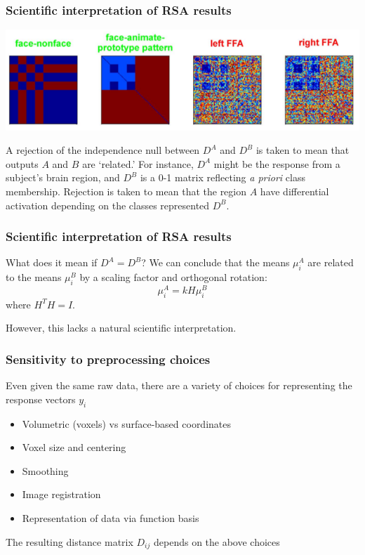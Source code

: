 \documentclass{beamer}
\begin{document}
\begin{frame}
\frametitle{Scientific interpretation of RSA results}
\begin{center}
\includegraphics[scale = 0.3]{k08_classes.png}
\end{center}

A rejection of the independence null between $D^A$ and $D^B$ is taken to mean that outputs $A$ and $B$ are `related.'
For instance, $D^A$ might be the response from a subject's brain region, and $D^B$ is a 0-1 matrix reflecting \emph{a priori} class membership.
Rejection is taken to mean that the region $A$ have differential activation depending on the classes represented $D^B$.
\end{frame}

\begin{frame}
\frametitle{Scientific interpretation of RSA results}

What does it mean if $D^A = D^B$? We can conclude that the means $\mu_i^A$ are related to the means $\mu_i^B$
by a scaling factor and orthogonal rotation:
\[
\mu_i^A = k H \mu_i^B
\]
where $H^T H = I$.

However, this lacks a natural scientific interpretation.
\end{frame}

\begin{frame}
\frametitle{Sensitivity to preprocessing choices}
Even given the same raw data, there are a variety of choices for representing the response vectors $y_i$
\begin{itemize}
\item Volumetric (voxels) vs surface-based coordinates
\item Voxel size and centering
\item Smoothing
\item Image registration
\item Representation of data via function basis
\end{itemize}

The resulting distance matrix $D_{ij}$ depends on the above choices
\end{frame}
\end{document}
